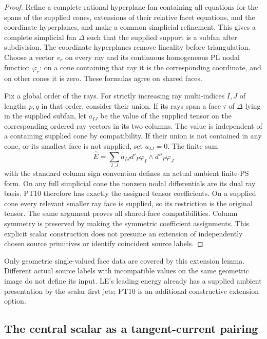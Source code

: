 \begin{proof}
Refine a complete rational hyperplane fan containing all
equations for the spans of the supplied cones, extensions
of their relative facet equations, and the coordinate
hyperplanes, and make a
common simplicial refinement.  This gives a complete
simplicial fan $\Delta$ such that the supplied support is
a subfan after subdivision.  The coordinate hyperplanes
remove lineality before triangulation.  Choose a vector
$v_r$ on every ray and its continuous homogeneous PL
nodal function $\varphi_r$: on a cone containing that ray
it is the corresponding coordinate, and on other cones
it is zero.  These formulas agree on shared faces.

Fix a global order of the rays.  For strictly increasing
ray multi-indices $I,J$ of lengths $p,q$ in that order,
consider their union.  If its rays span a face $\tau$
of $\Delta$ lying in the supplied subfan, let $a_{IJ}$
be the value of the supplied tensor on the corresponding
ordered ray vectors in its two columns.  The value is
independent of a containing supplied cone by compatibility.
If their union is not contained in any cone, or its smallest
face is not supplied, set $a_{IJ}=0$.  The finite sum
\[
     \widehat E=\sum_{I,J}a_{IJ}
                  d'_P\varphi_I\wedge d''_P\varphi_J
 \tag{PT10}
\]
with the standard column sign convention defines an actual
ambient finite-PS form.  On any full simplicial cone the
nonzero nodal differentials are its dual ray basis.  PT10
therefore has exactly the assigned tensor coefficients.
On a supplied cone every relevant smaller ray face is
supplied, so its restriction is the original tensor.
The same argument proves all shared-face compatibilities.
Column symmetry is preserved by making the symmetric
coefficient assignments.  This explicit scalar construction
does not presume an extension of independently chosen
source primitives or identify coincident source labels.
\end{proof}

Only geometric single-valued face data are covered by this
extension lemma.  Different actual source labels with
incompatible values on the same geometric image do not
define its input.  LE's leading energy already has a
supplied ambient presentation by the scalar first jets;
PT10 is an additional constructive extension option.

\subsection{The central scalar as a tangent-current pairing}

